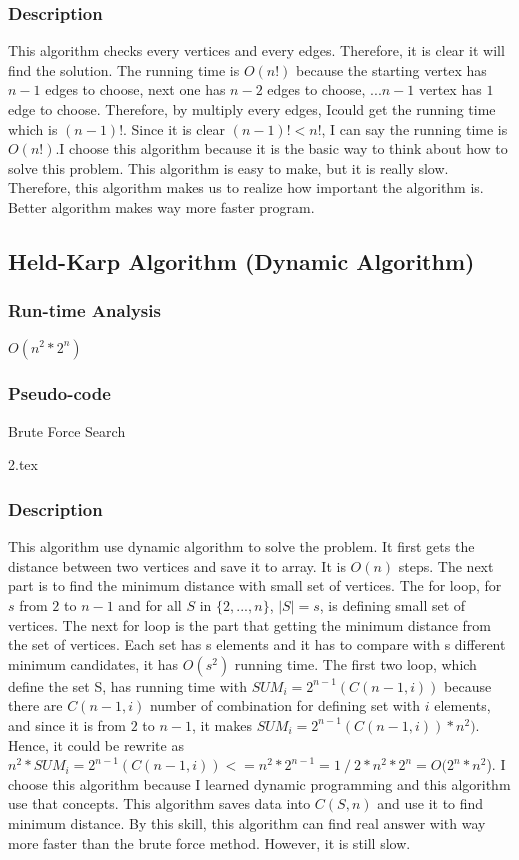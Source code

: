 \documentclass[onecolumn, draftclsnofoot,10pt, compsoc]{IEEEtran}
\begin{document}
\subsubsection{Description}
This algorithm checks every vertices and every edges. Therefore, it is clear it will find the solution. The running time is $O(n!)$ because the starting vertex has $n-1$  edges to choose, next one has $n-2$  edges to choose, $...  n-1$  vertex has $1$ edge to choose. Therefore, by multiply every edges, Icould get the running time which is $(n-1)!$. Since it is clear $(n-1)! <  n!$, I can say the running time is $O(n!)$.I choose this algorithm because it is the basic way to think about how to solve this problem. This algorithm is easy to make, but it is really slow. Therefore, this algorithm makes us to realize how important the algorithm is. Better algorithm makes way more faster program.

\newpage
\subsection{Held-Karp Algorithm (Dynamic Algorithm)}
\subsubsection{Run-time Analysis}
$O(n^2 * 2^n)$
\subsubsection{Pseudo-code}
\begin{algorithm}
\caption{Brute Force Search}
\label{alg:waypointAlgo}
\begin{algorithmic}[1]
{2.tex}
\end{algorithmic}
\end{algorithm}

\subsubsection{Description}
This algorithm use dynamic algorithm to solve the problem. It first gets the distance between two vertices and save it to array. It is $O(n)$ steps. The next part is to find the minimum distance with small set of vertices. The for loop, for $s$ from $2$ to $n-1$ and for all $S$  in $\{2, ..., n\}$, $|S| =  s$, is defining small set of vertices. The next for loop is the part that getting the minimum distance from the set of vertices. Each set has s  elements and it has to compare with s  different minimum candidates, it has $O(s^2)$ running time. The first two loop, which define the set S, has running time with $SUM_i=2 ^{n-1} (C(n-1,i))$ because there are $C(n-1, i)$ number of combination for defining set with $i$  elements, and since it is from $2$  to $n-1$, it makes $SUM_i=2 ^{n-1} (C(n-1,i)) *  n^2)$. Hence, it could be rewrite as $n^2 *  SUM_i=2 ^{n-1} (C(n-1,i)) <= n^2 *  2^{n-1} =  1⁄2  *  n^2 *  2^n =  O(2^n *  n^2$). I choose this algorithm because I learned dynamic programming and this algorithm use that concepts. This algorithm saves data into $C(S, n)$ and use it to find minimum distance. By this skill, this algorithm can find real answer with way more faster than the brute force method. However, it is still slow.
\end{document}
